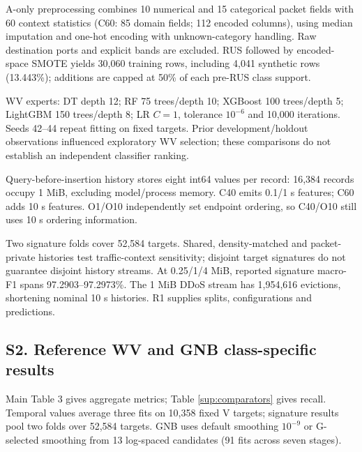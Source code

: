 \documentclass[10pt,a4paper]{article}
\begin{document}
A-only preprocessing combines 10 numerical and 15 categorical packet fields with 60 context statistics (C60: 85 domain fields; 112 encoded columns), using median imputation and one-hot encoding with unknown-category handling. Raw destination ports and explicit bands are excluded. RUS followed by encoded-space SMOTE yields 30,060 training rows, including 4,041 synthetic rows (13.443\%); additions are capped at 50\% of each pre-RUS class support.

WV experts: DT depth 12; RF 75 trees/depth 10; XGBoost 100 trees/depth 5; LightGBM 150 trees/depth 8; LR \(C=1\), tolerance \(10^{-6}\) and 10,000 iterations. Seeds 42--44 repeat fitting on fixed targets. Prior development/holdout observations influenced exploratory WV selection; these comparisons do not establish an independent classifier ranking.

Query-before-insertion history stores eight int64 values per record: 16,384 records occupy 1 MiB, excluding model/process memory. C40 emits 0.1/1 s features; C60 adds 10 s features. O1/O10 independently set endpoint ordering, so C40/O10 still uses 10 s ordering information.

Two signature folds cover 52,584 targets. Shared, density-matched and packet-private histories test traffic-context sensitivity; disjoint target signatures do not guarantee disjoint history streams. At 0.25/1/4 MiB, reported signature macro-F1 spans 97.2903--97.2973\%. The 1 MiB DDoS stream has 1,954,616 evictions, shortening nominal 10 s histories. R1 supplies splits, configurations and predictions.

\subsection*{S2. Reference WV and GNB class-specific results}

Main Table 3 gives aggregate metrics; Table \ref*{sup:comparators} gives recall. Temporal values average three fits on 10,358 fixed V targets; signature results pool two folds over 52,584 targets. GNB uses default smoothing \(10^{-9}\) or G-selected smoothing from 13 log-spaced candidates (91 fits across seven stages).
\end{document}
